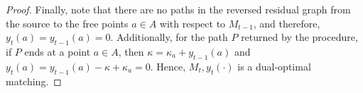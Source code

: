 \begin{proof}
Finally, note that there are no paths in the reversed residual graph from the source to the free points $a\in A$ with respect to $M_{t-1}$, and therefore, $y_t(a)=y_{t-1}(a)=0$. Additionally, for the path $P$ returned by the procedure, if $P$ ends at a point $a\in A$, then $\kappa = \kappa_a+y_{t-1}(a)$ and $y_t(a)=y_{t-1}(a)-\kappa+\kappa_a = 0$. Hence, $M_t, y_t(\cdot)$ is a dual-optimal matching. 
\end{proof}




